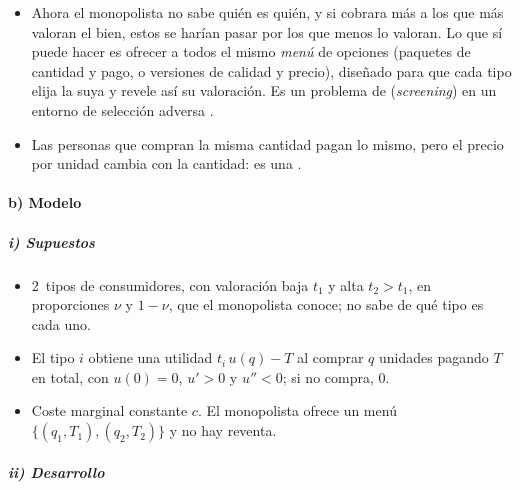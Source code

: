 \documentclass[11pt]{article}
\begin{document}
\begin{itemize}
\item Ahora el monopolista no sabe quién es quién, y si cobrara más a los que más valoran el bien, estos se harían pasar por los que menos lo valoran. Lo que sí puede hacer es ofrecer a todos el mismo \emph{menú} de opciones (paquetes de cantidad y pago, o versiones de calidad y precio), diseñado para que cada tipo elija la suya y revele así su valoración. Es un problema de  (\emph{screening}) en un entorno de selección adversa \nocite{MussaRosen1978Monopoly,MaskinRiley1984Monopoly}.
\item Las personas que compran la misma cantidad pagan lo mismo, pero el precio por unidad cambia con la cantidad: es una .
\end{itemize}

\paragraph{b) Modelo}

\subparagraph{i) Supuestos}

\begin{itemize}
\item 2~tipos de consumidores, con valoración baja $t_1$ y alta $t_2>t_1$, en proporciones $\nu$ y $1-\nu$, que el monopolista conoce; no sabe de qué tipo es cada uno.
\item El tipo $i$ obtiene una utilidad $t_i\,u(q)-T$ al comprar $q$ unidades pagando $T$ en total, con $u(0)=0$, $u'>0$ y $u''<0$; si no compra, 0.
\item Coste marginal constante $c$. El monopolista ofrece un menú $\{(q_1,T_1),(q_2,T_2)\}$ y no hay reventa.
\end{itemize}

\subparagraph{ii) Desarrollo}
\end{document}
